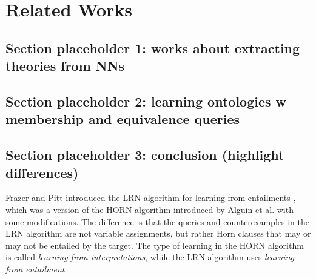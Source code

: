 \chapter{Related Works}

\section{Section placeholder 1: works about extracting theories from NNs}

\section{Section placeholder 2: learning ontologies w membership and equivalence queries}

\section{Section placeholder 3: conclusion (highlight differences)}

Frazer and Pitt introduced the LRN algorithm for learning from entailments \cite{DBLP_conf/icml/FrazierP93}, which was a version of the HORN algorithm introduced by Alguin et al. \cite{DBLP:journals/ml/AngluinFP92} with some modifications. The difference is that the queries and counterexamples in the LRN algorithm are not variable assignments, but rather Horn clauses that may or may not be entailed by the target. The type of learning in the HORN algorithm is called \emph{learning from interpretations}, while the LRN algorithm uses \emph{learning from entailment}.

